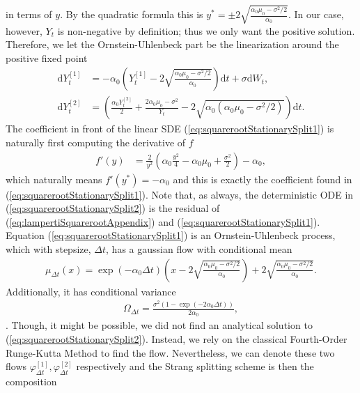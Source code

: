 in terms of $y$. By the quadratic formula this is $y^* = \pm 2\sqrt{\frac{\alpha_0\mu_0 - \sigma^2 / 2}{\alpha_0}}$. In our case, however, $Y_t$ is non-negative by definition; thus we only want the positive solution. Therefore, we let the Ornstein-Uhlenbeck part be the linearization around the positive fixed point
\begin{align}
    \mathrm{d}Y_t^{[1]} &= -\alpha_0 \left(Y_t^{[1]} - 2\sqrt{\frac{\alpha_0\mu_0 - \sigma^2 / 2}{\alpha_0}}\right)\mathrm{d}t + \sigma \mathrm{d}W_t , \label{eq:squarerootStationarySplit1} \\
    \mathrm{d}Y_t^{[2]} &= \left(\frac{\alpha_0 Y_t^{[2]}}{2} + \frac{2\alpha_0 \mu_0 - \sigma^2}{Y_t} - 2\sqrt{\alpha_0\left(\alpha_0\mu_0 - \sigma^2 / 2\right)}\right)\mathrm{d}t. \label{eq:squarerootStationarySplit2}
\end{align}
The coefficient in front of the linear SDE (\ref{eq:squarerootStationarySplit1}) is naturally first computing the derivative of $f$
\begin{align}
    f'(y) &= \frac{2}{y^2}\left(\alpha_0\frac{y^2}{4}-\alpha_0\mu_0+\frac{\sigma^2}{2}\right) - \alpha_0,
\end{align}
which naturally means $f'(y^*) = - \alpha_0$ and this is exactly the coefficient found in (\ref{eq:squarerootStationarySplit1}). Note that, as always, the deterministic ODE in (\ref{eq:squarerootStationarySplit2}) is the residual of (\ref{eq:lampertiSquarerootAppendix}) and (\ref{eq:squarerootStationarySplit1}).
Equation (\ref{eq:squarerootStationarySplit1}) is an Ornstein-Uhlenbeck process, which with stepsize, $\Delta t$, has a gaussian flow with conditional mean 
\begin{align}
    \mu_{\Delta t}(x) = \exp\left(-\alpha_0 \Delta t\right) \left(x - 2\sqrt{\frac{\alpha_0\mu_0 - \sigma^2 / 2}{\alpha_0}}\right) + 2\sqrt{\frac{\alpha_0\mu_0 - \sigma^2 / 2}{\alpha_0}}.
\end{align}
Additionally, it has conditional variance
\begin{align}
     \Omega_{\Delta t} = \frac{\sigma^2\left(1 - \exp\left(-2\alpha_0 \Delta t\right)\right)}{2\alpha_0},
\end{align}
\cite[(5), (6)]{SplittingSchemes}. Though, it might be possible, we did not find an analytical solution to (\ref{eq:squarerootStationarySplit2}). Instead, we rely on the classical Fourth-Order Runge-Kutta Method \cite[p. 541]{numericalAnalysis} to find the flow. Nevertheless, we can denote these two flows $\varphi_{\Delta t}^{[1]}, \varphi_{\Delta t}^{[2]}$ respectively and the Strang splitting scheme is then the composition
